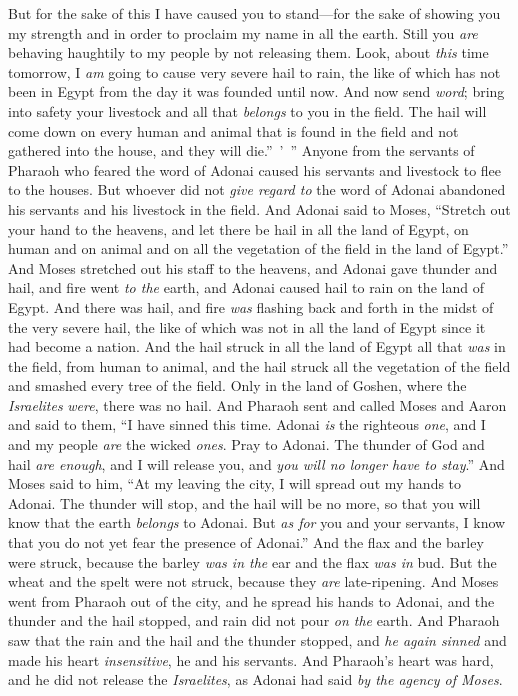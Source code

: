 \begin{biblechapter}
\verse But for the sake of this I have caused you to stand—for the sake of showing you my strength and in order to proclaim my name in all the earth.
\verse Still you \textit{are} behaving haughtily to my people by not releasing them.
\verse Look, about \textit{this} time tomorrow, I \textit{am} going to cause very severe hail to rain, the like of which has not been in Egypt from the day it was founded until now.
\verse And now send \textit{word}; bring into safety your livestock and all that \textit{belongs} to you in the field. The hail will come down on every human and animal that is found in the field and not gathered into the house, and they will die.” ’ ”
\verse Anyone from the servants of Pharaoh who feared the word of Adonai caused his servants and livestock to flee to the houses.
\verse But whoever did not \textit{give regard to} the word of Adonai abandoned his servants and his livestock in the field.
\verse And Adonai said to Moses, “Stretch out your hand to the heavens, and let there be hail in all the land of Egypt, on human and on animal and on all the vegetation of the field in the land of Egypt.”
\verse And Moses stretched out his staff to the heavens, and Adonai gave thunder and hail, and fire went \textit{to the} earth, and Adonai caused hail to rain on the land of Egypt.
\verse And there was hail, and fire \textit{was} flashing back and forth in the midst of the very severe hail, the like of which was not in all the land of Egypt since it had become a nation.
\verse And the hail struck in all the land of Egypt all that \textit{was} in the field, from human to animal, and the hail struck all the vegetation of the field and smashed every tree of the field.
\verse Only in the land of Goshen, where the \textit{Israelites} \textit{were}, there was no hail.
\verse And Pharaoh sent and called Moses and Aaron and said to them, “I have sinned this time. Adonai \textit{is} the righteous \textit{one}, and I and my people \textit{are} the wicked \textit{ones}.
\verse Pray to Adonai. The thunder of God and hail \textit{are enough}, and I will release you, and \textit{you will no longer have to stay}.”
\verse And Moses said to him, “At my leaving the city, I will spread out my hands to Adonai. The thunder will stop, and the hail will be no more, so that you will know that the earth \textit{belongs} to Adonai.
\verse But \textit{as for} you and your servants, I know that you do not yet fear the presence of Adonai.”
\verse And the flax and the barley were struck, because the barley \textit{was in the} ear and the flax \textit{was in} bud.
\verse But the wheat and the spelt were not struck, because they \textit{are} late-ripening.
\verse And Moses went from Pharaoh out of the city, and he spread his hands to Adonai, and the thunder and the hail stopped, and rain did not pour \textit{on the} earth.
\verse And Pharaoh saw that the rain and the hail and the thunder stopped, and \textit{he again sinned} and made his heart \textit{insensitive}, he and his servants.
\verse And Pharaoh’s heart was hard, and he did not release the \textit{Israelites}, as Adonai had said \textit{by the agency of Moses}.
\end{biblechapter}

